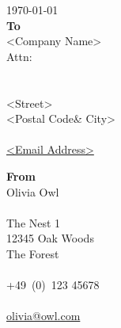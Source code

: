 
\opencolumnpage

\begin{flushright}
	{\normalsize

		{\large \today}\\[\baselineskip]
		\vspace{1.15cm}
		{\large \bfseries To}\\[\baselineskip]
		<Company Name>\\[\baselineskip]
		Attn:\\<Name of Recipient>\\[\baselineskip]
		{\color{accentcolor}{\faMapMarker}}\\
		<Street>\\<Postal Code\& City>\\[\baselineskip]
		{\color{accentcolor}{\faEnvelopeO}}\\
		\href{}{<Email Address>}


		\vspace{2cm}
		{\large \bfseries From}\\[\baselineskip]
		Olivia Owl\\[\baselineskip]
		{\color{accentcolor}{\faMapMarker}}\\
		The Nest 1\\12345 Oak Woods\\The Forest\\[\baselineskip]
		{\color{accentcolor}{\faMobile}}\\
		+49~(0)~123 45678\\[\baselineskip]
		{\color{accentcolor}{\faEnvelopeO}}\\
		\href{mailto:olivia@owl.com}{olivia@owl.com}
	}
\end{flushright}
\switchtomaincolumn


